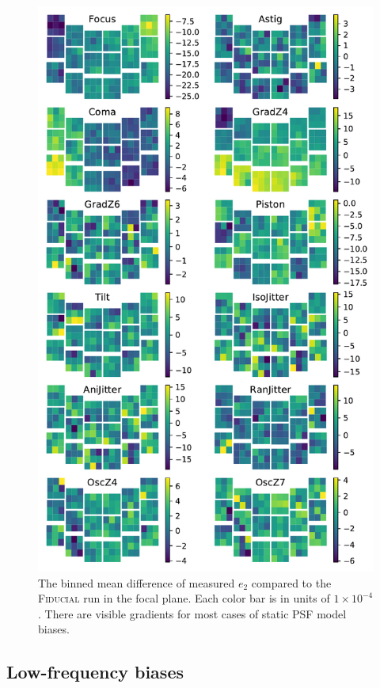 \documentclass[aps,prd, amsmath,amssymb,superscriptaddress,showkeys,nofootinbib,reprint,preprintnumbers]{revtex4-1}
\begin{document}
\begin{figure}
\begin{center}
\includegraphics[width=\columnwidth]{figures/focal_mean_e2.pdf}
\end{center}
\caption[]{
The binned mean difference of measured $e_2$ compared to the \textsc{Fiducial} run in the focal plane.  Each color bar is in units of $1\times 10^{-4}$. There are visible gradients for most cases of static PSF model biases.
\label{fig:focal_mean_e2}}
\end{figure}

\subsection{Low-frequency biases}\label{sec:high}
\end{document}
